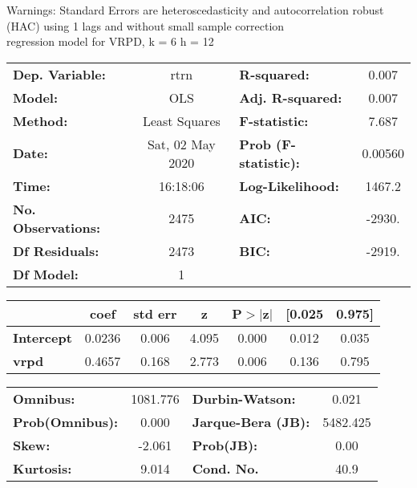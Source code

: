 Warnings: \newline
 [1] Standard Errors are heteroscedasticity and autocorrelation robust (HAC) using 1 lags and without small sample correction\\ 

regression model for VRPD, k = 6 h = 12\begin{center}
\begin{tabular}{lclc}
\toprule
\textbf{Dep. Variable:}    &       rtrn       & \textbf{  R-squared:         } &     0.007   \\
\textbf{Model:}            &       OLS        & \textbf{  Adj. R-squared:    } &     0.007   \\
\textbf{Method:}           &  Least Squares   & \textbf{  F-statistic:       } &     7.687   \\
\textbf{Date:}             & Sat, 02 May 2020 & \textbf{  Prob (F-statistic):} &  0.00560    \\
\textbf{Time:}             &     16:18:06     & \textbf{  Log-Likelihood:    } &    1467.2   \\
\textbf{No. Observations:} &        2475      & \textbf{  AIC:               } &    -2930.   \\
\textbf{Df Residuals:}     &        2473      & \textbf{  BIC:               } &    -2919.   \\
\textbf{Df Model:}         &           1      & \textbf{                     } &             \\
\bottomrule
\end{tabular}
\begin{tabular}{lcccccc}
                   & \textbf{coef} & \textbf{std err} & \textbf{z} & \textbf{P$> |$z$|$} & \textbf{[0.025} & \textbf{0.975]}  \\
\midrule
\textbf{Intercept} &       0.0236  &        0.006     &     4.095  &         0.000        &        0.012    &        0.035     \\
\textbf{vrpd}      &       0.4657  &        0.168     &     2.773  &         0.006        &        0.136    &        0.795     \\
\bottomrule
\end{tabular}
\begin{tabular}{lclc}
\textbf{Omnibus:}       & 1081.776 & \textbf{  Durbin-Watson:     } &    0.021  \\
\textbf{Prob(Omnibus):} &   0.000  & \textbf{  Jarque-Bera (JB):  } & 5482.425  \\
\textbf{Skew:}          &  -2.061  & \textbf{  Prob(JB):          } &     0.00  \\
\textbf{Kurtosis:}      &   9.014  & \textbf{  Cond. No.          } &     40.9  \\
\bottomrule
\end{tabular}
\end{center}

